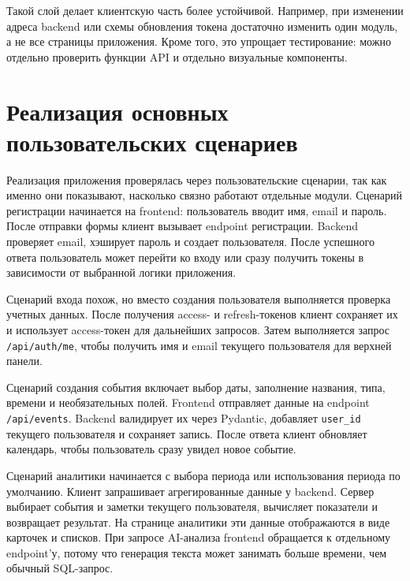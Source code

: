 \documentclass[14pt,a4paper]{extreport}
\begin{document}
Такой слой делает клиентскую часть более устойчивой. Например, при изменении адреса backend или схемы обновления токена достаточно изменить один модуль, а не все страницы приложения. Кроме того, это упрощает тестирование: можно отдельно проверить функции API и отдельно визуальные компоненты.

\section{Реализация основных пользовательских сценариев}

Реализация приложения проверялась через пользовательские сценарии, так как именно они показывают, насколько связно работают отдельные модули. Сценарий регистрации начинается на frontend: пользователь вводит имя, email и пароль. После отправки формы клиент вызывает endpoint регистрации. Backend проверяет email, хэширует пароль и создает пользователя. После успешного ответа пользователь может перейти ко входу или сразу получить токены в зависимости от выбранной логики приложения.

Сценарий входа похож, но вместо создания пользователя выполняется проверка учетных данных. После получения access- и refresh-токенов клиент сохраняет их и использует access-токен для дальнейших запросов. Затем выполняется запрос \texttt{/api/auth/me}, чтобы получить имя и email текущего пользователя для верхней панели.

Сценарий создания события включает выбор даты, заполнение названия, типа, времени и необязательных полей. Frontend отправляет данные на endpoint \texttt{/api/events}. Backend валидирует их через Pydantic, добавляет \texttt{user\_id} текущего пользователя и сохраняет запись. После ответа клиент обновляет календарь, чтобы пользователь сразу увидел новое событие.

Сценарий аналитики начинается с выбора периода или использования периода по умолчанию. Клиент запрашивает агрегированные данные у backend. Сервер выбирает события и заметки текущего пользователя, вычисляет показатели и возвращает результат. На странице аналитики эти данные отображаются в виде карточек и списков. При запросе AI-анализа frontend обращается к отдельному endpoint'у, потому что генерация текста может занимать больше времени, чем обычный SQL-запрос.
\end{document}
